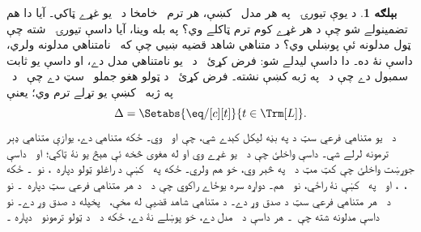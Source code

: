\documentclass[12pt,a4paper,oneside]{report}
\theoremstyle{definition}
\newtheorem{ex}[thm]{بېلګه}
\begin{document}
\label{olpseg:OLP-0135-B013:start}
%
\begin{ex}
د يوې تيورۍ~\LR{$\Gamma$} په هر مدل~ کښې، هر ترم~ خامخا
د~ يو غړے ټاکي۔ آيا دا هم تضمينولے شو چې د
 هر غړے کوم ترم ټاکلے وي؟ په بله وينا، آيا داسې
تيورۍ~\LR{$\Gamma$} شته چې ټول مدلونه ئې پوښلي وي؟ د متناهي شاهد قضيه
ښيي چې که~\LR{$\Gamma$} نامتناهي مدلونه ولري، داسې نۀ ده۔ دا داسې
ليدلے شو: فرض کړئ~ د~\LR{$\Gamma$} يو نامتناهي مدل دے، او
 داسې يو ثابت سمبول دے چې د~\LR{$\Gamma$} په ژبه کښې نشته۔ فرض
کړئ~\LR{$\Delta$} د ټولو هغو جملو~\LR{$\eq/[c][t]$} سټ دے چې~ د~\LR{$\Gamma$}
په ژبه~ کښې يو تړلے ترم وي؛ يعنې
  \[
  \Delta = \Setabs{\eq/[c][t]}{t \in \Trm[L]}.
  \]
د~\LR{$\Gamma \cup \Delta$} يو متناهي فرعي سټ د
 په بڼه ليکل کېدے شي، چې
 او~ وي۔ ځکه
 متناهي دے، يوازې متناهي ډېر ترمونه لرلے شي۔ داسې
 واخلئ چې د~ يو غړے وي او له
هغوى څخه ئې هېڅ يو نۀ ټاکي؛ او~ داسې جوړښت
واخلئ چې کټ مټ د~ په څېر وي، خو
 هم ولري۔ ځکه په~ کښې د راغلو ټولو
 دپاره~، نو~۔ ځکه
،~، او~ په~\LR{$\Gamma$}
کښې نۀ راځي، نو~ هم۔ دواړه سره يوځاے راکوي چې
د~\LR{$\Gamma \cup \Delta$} د هر متناهي فرعي سټ
 دپاره~۔
نو د~\LR{$\Gamma \cup \Delta$} هر متناهي فرعي سټ د صدق وړ دے۔ د
متناهي شاهد قضيې له مخې،~\LR{$\Gamma \cup \Delta$} پخپله د صدق وړ دے۔
نو داسې مدلونه شته چې~۔ هر داسې
 د~\LR{$\Gamma$} مدل دے، خو پوښلے نۀ دے، ځکه د~
د ټولو ترمونو~ دپاره
۔
\end{ex}
\label{olpseg:OLP-0135-B013:end}
\end{document}
